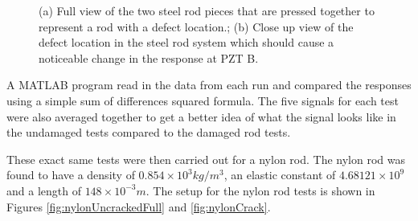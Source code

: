 \begin{figure}
\begin{subfigmatrix}{2}
\end{subfigmatrix}

   \caption
   { \label{fig:steelCrack}
(a) Full view of the two steel rod pieces that are pressed together to represent a rod with a defect location.;
(b) Close up view of the defect location in the steel rod system which should cause a noticeable change in the response at PZT B.
 }
   \end{figure}
   
A MATLAB program read in the data from each run and compared the responses using a simple sum of differences squared formula. The five signals for each test were also averaged together to get a better idea of what the signal looks like in the undamaged tests compared to the damaged rod tests.

These exact same tests were then carried out for a nylon rod. The nylon rod was found to have a density of $0.854 \times 10^3 kg/m^3$, an elastic constant of $4.68121 \times 10^9$ and a length of $148 \times 10^{-3} m$. The setup for the nylon rod tests is shown in Figures \ref{fig:nylonUncrackedFull} and \ref{fig:nylonCrack}.


